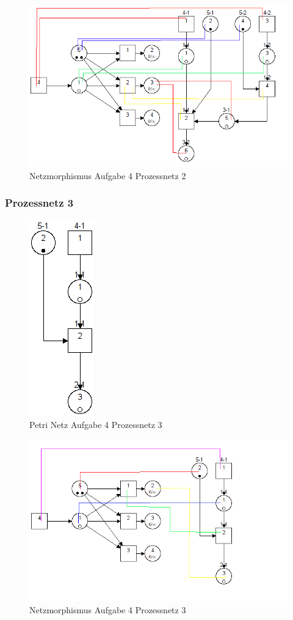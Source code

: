 \documentclass[10pt]{scrartcl}
\begin{document}
			\begin{figure}[H]
    			\centering
				\includegraphics[scale=0.5]{transf2.png}		
            	\caption{Netzmorphismus Aufgabe 4 Prozessnetz 2}
            	\label{petri:aufg4:pro2:morph}
			\end{figure}	
							
		\subsubsection{Prozessnetz 3}
			\begin{figure}[H]
    			\centering
				\includegraphics[scale=0.75]{aufg4Proc3.png}		
            	\caption{Petri Netz Aufgabe 4 Prozessnetz 3}
            	\label{petri:aufg4:pro3}
			\end{figure}	
			
			\begin{figure}[H]
    			\centering
				\includegraphics[scale=0.5]{transf3.png}		
            	\caption{Netzmorphismus Aufgabe 4 Prozessnetz 3}
            	\label{petri:aufg4:pro3:morph}
			\end{figure}			
\end{document}
